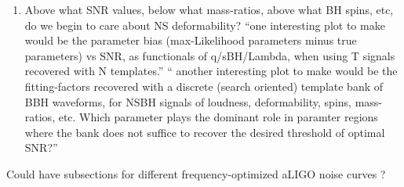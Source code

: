 \documentclass[aps,prd,amsmath,floats,floatfix, twocolumn,
superscriptaddress,nofootinbib,showpacs]{revtex4-1}
\newcommand{\prayush}{\textcolor{red!40!black}}
\begin{document}
\begin{enumerate}
\item Above what SNR values, below what mass-ratios, above what BH spins, etc, 
do we begin to care about NS deformability?\newline
``one interesting plot to make would be the parameter bias (max-Likelihood
parameters minus true parameters) vs SNR, as functionals of q/sBH/Lambda, when
using T signals recovered with N templates.''\newline
`` another interesting plot to make would be the fitting-factors recovered with
a discrete (search oriented) template bank of BBH waveforms, for NSBH signals of
loudness, deformability, spins, mass-ratios, etc. Which parameter plays the 
dominant role in paramter regions where the bank does not suffice to recover
the desired threshold of optimal SNR?''
\end{enumerate}


\prayush{Could have subsections for different frequency-optimized aLIGO noise curves ?}

\hspace{5mm}



\end{document}
